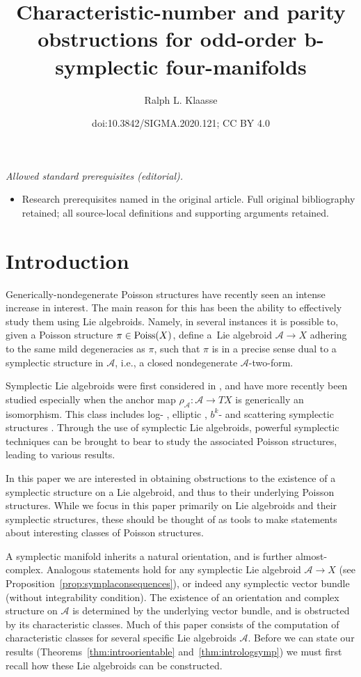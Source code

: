 \documentclass[10pt,a4paper]{amsart}
\title{Characteristic-number and parity obstructions for odd-order b-symplectic four-manifolds}
\author{Ralph L. Klaasse}
\date{doi:10.3842/SIGMA.2020.121; CC BY 4.0}
\numberwithin{equation}{section}
\begin{document}
\maketitle
\noindent\textit{Allowed standard prerequisites (editorial).}\begin{itemize}
\item Research prerequisites named in the original article. Full original bibliography retained; all source-local definitions and supporting arguments retained.
\end{itemize}\medskip
\section{Introduction}\label{sec:introduction}

Generically-nondegenerate Poisson structures have recently seen an intense increase in interest. The main reason for this has been the ability to effectively study them using Lie algebroids. Namely, in several instances it is possible to, given a Poisson structure $\pi \in {\rm Poiss}(X)$, define a~Lie algebroid $\mathcal{A} \to X$ adhering to the same mild degeneracies as $\pi$, such that $\pi$ is in a precise sense dual to a symplectic structure in $\mathcal{A}$, i.e., a closed nondegenerate $\mathcal{A}$-two-form.

Symplectic Lie algebroids were first considered in \cite{NestTsygan01}, and have more recently been studied especially when the anchor map $\rho_\mathcal{A}\colon \mathcal{A} \to TX$ is generically an isomorphism. This class includes log- \cite{Cavalcanti17,GualtieriLi14,GuilleminMirandaPires14,MarcutOsornoTorres14,MarcutOsornoTorres14two}, elliptic \cite{CavalcantiGualtieri18, CavalcantiKlaasse18}, $b^k$- \cite{GuilleminMirandaWeitsman17, MirandaPlanas18two, MirandaPlanas18, Scott16} and scattering symplectic structures \cite{Lanius16}. Through the use of symplectic Lie algebroids, powerful symplectic techniques can be brought to bear to study the associated Poisson structures, leading to various results.

In this paper we are interested in obtaining obstructions to the existence of a symplectic structure on a Lie algebroid, and thus to their underlying Poisson structures. While we focus in this paper primarily on Lie algebroids and their symplectic structures, these should be thought of as tools to make statements about interesting classes of Poisson structures.

A symplectic manifold inherits a natural orientation, and is further almost-complex. Analogous statements hold for any symplectic Lie algebroid $\mathcal{A} \to X$ (see Proposition~\ref{prop:symplaconsequences}), or indeed any symplectic vector bundle (without integrability condition). The existence of an orientation and complex structure on $\mathcal{A}$ is determined by the underlying vector bundle, and is obstructed by its characteristic classes. Much of this paper consists of the computation of characteristic classes for several specific Lie algebroids $\mathcal{A}$. Before we can state our results (Theorems~\ref{thm:introorientable} and~\ref{thm:intrologsymp}) we must first recall how these Lie algebroids can be constructed.
\end{document}
